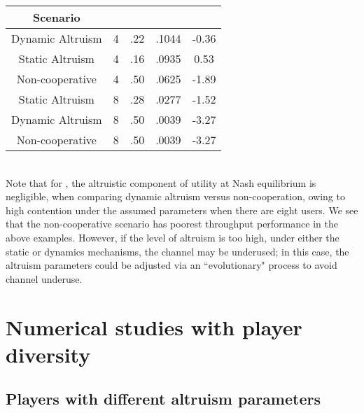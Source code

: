 \documentclass[12pt,onecolumn,draftcls]{IEEEtran}
\begin{document}
\begin{tabular}{c|c|c|c|c}
Scenario &  &  &   &   \\ \hline
Dynamic Altruism & 4 & .22 & .1044 & -0.36 \\
Static Altruism & 4 & .16 & .0935 &  0.53 \\
Non-cooperative   & 4 & .50 & .0625 & -1.89 \\
Static Altruism & 8 & .28 & .0277 & -1.52 \\
Dynamic Altruism & 8 & .50 & .0039 & -3.27 \\
Non-cooperative   & 8 & .50 & .0039 & -3.27 
\end{tabular}



~\\
Note that for , the altruistic component of utility at Nash
equilibrium is negligible, when comparing dynamic altruism versus
non-cooperation, owing to high contention under the assumed parameters when
there are eight users. We see that the non-cooperative scenario has poorest
throughput performance in the above examples. However, if the level of
altruism is too high, under either the static or dynamics mechanisms, the
channel may be underused; in this case, the altruism parameters could
be adjusted via an ``evolutionary" process to avoid channel
underuse.





\section{Numerical studies with player diversity}\label{num-sec-diversity}



\subsection{Players with different altruism parameters}
\end{document}
